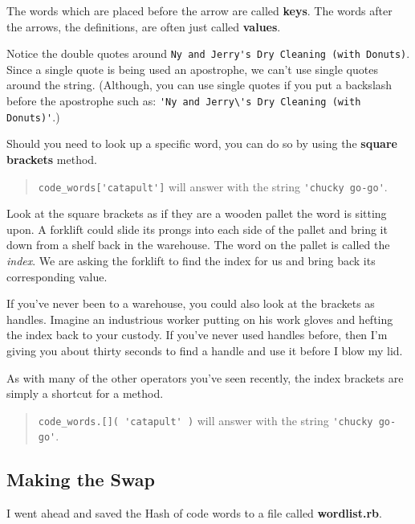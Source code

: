 \documentclass[10pt,twoside]{report}
\begin{document}
The words which are placed before the arrow are called {\bf keys}.
The words after the arrows, the definitions, are often just called
{\bf values}.

Notice the double quotes around \lstinline[breaklines=true]|Ny and Jerry's Dry Cleaning (with Donuts)|.  
Since a single quote is being used an apostrophe, we can't use single
quotes around the string.  (Although, you can use single quotes if you
put a backslash before the apostrophe such as:
\lstinline[breaklines=true]|'Ny and Jerry\'s Dry Cleaning (with Donuts)'|.)

Should you need to look up a specific word, you can do so by using the
{\bf square brackets} method.

\begin{quote}
\lstinline[breaklines=true]|code_words['catapult']| will answer with
the string \lstinline[breaklines=true]|'chucky go-go'|.\end{quote}


Look at the square brackets as if they are a wooden pallet the word is
sitting upon. A forklift could slide its prongs into each side of the
pallet and bring it down from a shelf back in the warehouse.  The word
on the pallet is called the {\em index}. We are asking the forklift to
find the index for us and bring back its corresponding value.

If you've never been to a warehouse, you could also look at the
brackets as handles. Imagine an industrious worker putting on his work
gloves and hefting the index back to your custody.  If you've never
used handles before, then I'm giving you about thirty seconds to find
a handle and use it before I blow my lid.

As with many of the other operators you've seen recently, the index
brackets are simply a shortcut for a method.

\begin{quote}
\lstinline[breaklines=true]|code_words.[]( 'catapult' )| will answer
with the string \lstinline[breaklines=true]|'chucky go-go'|.\end{quote}




\subsection{Making the Swap}



I went ahead and saved the Hash of code words to a file called {\bf
  wordlist.rb}.
\end{document}
